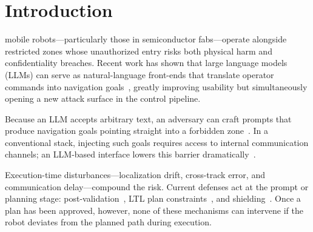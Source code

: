 \documentclass[journal,twoside,web]{ieeecolor}
\begin{document}
\section{Introduction}

 mobile robots---particularly those in semiconductor fabs---operate alongside restricted zones whose unauthorized entry risks both physical harm and confidentiality breaches. Recent work has shown that large language models (LLMs) can serve as natural-language front-ends that translate operator commands into navigation goals~\cite{ahn2023do,liang2023code,singh2023progprompt,huang2023inner,huang2022language}, greatly improving usability but simultaneously opening a new attack surface in the control pipeline.

Because an LLM accepts arbitrary text, an adversary can craft prompts that produce navigation goals pointing straight into a forbidden zone~\cite{perez2022ignore,greshake2023not,robey2025jailbreaking}. In a conventional stack, injecting such goals requires access to internal communication channels; an LLM-based interface lowers this barrier dramatically~\cite{yaacoub2022robotics}.

Execution-time disturbances---localization drift, cross-track error, and communication delay---compound the risk. Current defenses act at the prompt or planning stage: post-validation~\cite{yang2024plug}, LTL plan constraints~\cite{wu2025selp}, and shielding~\cite{alshiekh2018safe}. Once a plan has been approved, however, none of these mechanisms can intervene if the robot deviates from the planned path during execution.
\end{document}
